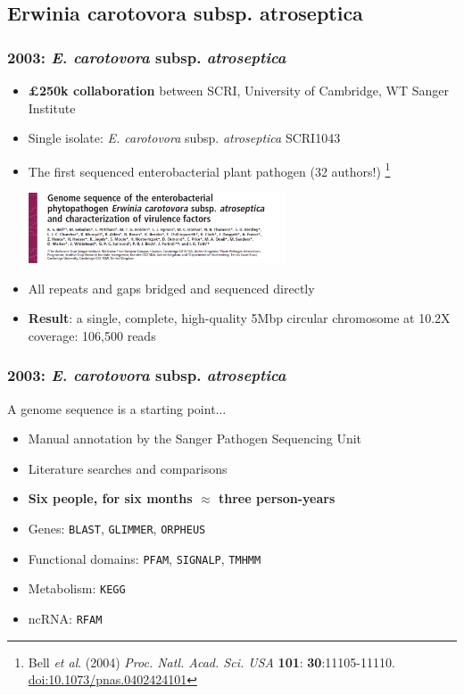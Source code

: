 \subsection{Erwinia carotovora subsp. atroseptica}

\begin{frame}
  \frametitle{2003: \textit{E. carotovora} subsp. \textit{atroseptica}}
  \begin{itemize}
    \item \textbf{ \pounds250k collaboration} between SCRI, University of Cambridge, WT Sanger Institute
    \item Single isolate: \textit{E. carotovora} subsp. \textit{atroseptica} SCRI1043
    \item The first sequenced enterobacterial plant pathogen (32 authors!) \footnote{\tiny{Bell \textit{et al}. (2004) \textit{Proc. Natl. Acad. Sci. USA} \textbf{101}: \textbf{30}:11105-11110. \href{http://dx.doi.org/10.1073/pnas.0402424101}{doi:10.1073/pnas.0402424101}}}\\ 
      \begin{center}
        \includegraphics[width=0.6\textwidth]{images/pba_pnas}
      \end{center}    
    \item All repeats and gaps bridged and sequenced directly
    \item \textbf{Result}: a single, complete, high-quality 5Mbp circular chromosome at 10.2X coverage: 106,500 reads
  \end{itemize}
\end{frame}

\begin{frame}
  \frametitle{2003: \textit{E. carotovora} subsp. \textit{atroseptica}}
  A genome sequence is a starting point$\ldots$
  \begin{itemize}
    \item Manual annotation by the Sanger Pathogen Sequencing Unit
    \item Literature searches and comparisons
    \item \textbf{Six people, for six months $\approx$ three person-years}
    \item Genes: \texttt{BLAST}, \texttt{GLIMMER}, \texttt{ORPHEUS}
    \item Functional domains: \texttt{PFAM}, \texttt{SIGNALP}, \texttt{TMHMM}
    \item Metabolism: \texttt{KEGG}
    \item ncRNA: \texttt{RFAM}
  \end{itemize}
\end{frame}

